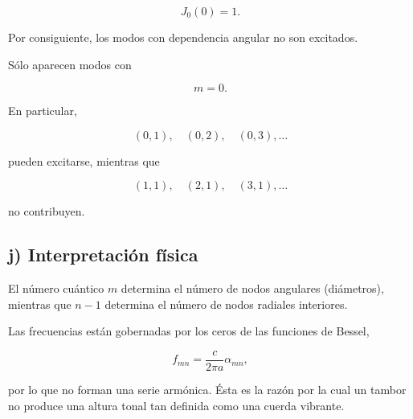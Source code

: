 \documentclass[11pt,spanish]{article}
\begin{document}
\[
J_0(0)=1.
\]

Por consiguiente, los modos con dependencia angular no son excitados.

Sólo aparecen modos con

\[
m=0.
\]

En particular,

\[
(0,1),\quad (0,2),\quad (0,3),\ldots
\]

pueden excitarse, mientras que

\[
(1,1),\quad (2,1),\quad (3,1),\ldots
\]

no contribuyen.

\subsection*{j) Interpretación física}

El número cuántico $m$ determina el número de nodos angulares (diámetros), mientras que $n-1$ determina el número de nodos radiales interiores.

Las frecuencias están gobernadas por los ceros de las funciones de Bessel,

\[
f_{mn}
=
\frac{c}{2\pi a}\alpha_{mn},
\]

por lo que no forman una serie armónica. Ésta es la razón por la cual un tambor no produce una altura tonal tan definida como una cuerda vibrante.









 
%
%
\end{document}
